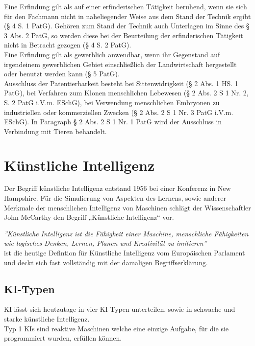 Eine Erfindung gilt als auf einer erfinderischen Tätigkeit beruhend, wenn sie sich für den Fachmann
nicht in naheliegender Weise aus dem Stand der Technik ergibt (§ 4 S. 1 PatG). Gehören zum Stand
der Technik auch Unterlagen im Sinne des § 3 Abs. 2 PatG, so werden diese bei der Beurteilung der
erfinderischen Tätigkeit nicht in Betracht gezogen (§ 4 S. 2 PatG).
\\
Eine Erfindung gilt als gewerblich anwendbar, wenn ihr Gegenstand auf irgendeinem gewerblichen
Gebiet einschließlich der Landwirtschaft hergestellt oder benutzt werden kann (§ 5 PatG).
\\
Ausschluss der Patentierbarkeit besteht bei Sittenwidrigkeit (§ 2 Abs. 1 HS. 1 PatG), bei Verfahren zum Klonen menschlichen Lebewesen (§ 2 Abs. 2 S 1 Nr. 2, S. 2 PatG i.V.m. ESchG), bei Verwendung menschlichen Embryonen zu industriellen oder kommerziellen Zwecken (§ 2 Abs. 2 S 1 Nr. 3 PatG i.V.m. ESchG). In Paragraph § 2 Abs. 2 S 1 Nr. 1 PatG wird der Ausschluss in Verbindung mit Tieren behandelt.




\section{Künstliche Intelligenz\label{sec:bb}}

Der Begriff künstliche Intelligenz entstand 1956 bei einer 
Konferenz in New Hampshire. Für die Simulierung von Aspekten des 
Lernens, sowie anderer Merkmale der menschlichen Intelligenz von 
Maschinen schlägt der Wissenschaftler John McCarthy den Begriff 
„Künstliche Intelligenz“ vor. 
\cite{WasIstKuenstliche2021} \cite{WhatAIBasica}

\textit{''Künstliche Intelligenz ist die Fähigkeit einer Maschine, 
menschliche Fähigkeiten wie logisches Denken, Lernen, Planen und 
Kreativität zu imitieren''} \\ \cite{WasIstKuenstliche2020}
ist die heutige Defintion für Künstliche Intelligenz vom Europäischen Parlament 
und deckt sich fast vollständig mit der damaligen Begriffserklärung.

\subsection{KI-Typen}
KI lässt sich heutzutage in vier KI-Typen unterteilen, 
sowie in schwache und starke künstliche Intelligenz.
\\

Typ 1 KIs sind reaktive 
Maschinen welche eine einzige Aufgabe, für die sie programmiert wurden, 
erfüllen können.
\\

